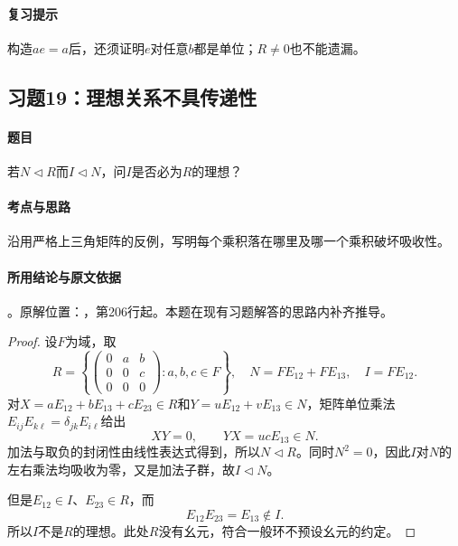 \paragraph{复习提示}

构造$ae=a$后，还须证明$e$对任意$b$都是单位；$R\ne0$也不能遗漏。



\subsection{习题19：理想关系不具传递性}

\label{ex:3:19}

\paragraph{题目}

若$N\lhd R$而$I\lhd N$，问$I$是否必为$R$的理想？

\paragraph{考点与思路}

沿用严格上三角矩阵的反例，写明每个乘积落在哪里及哪一个乘积破坏吸收性。

\paragraph{所用结论与原文依据}

。原解位置：，第206行起。本题在现有习题解答的思路内补齐推导。


\begin{proof}

设$F$为域，取
\[
R=\left\{\begin{pmatrix}0&a&b\\0&0&c\\0&0&0\end{pmatrix}:a,b,c\in F\right\},\quad
N=FE_{12}+FE_{13},\quad I=FE_{12}.
\]
对$X=aE_{12}+bE_{13}+cE_{23}\in R$和$Y=uE_{12}+vE_{13}\in N$，矩阵单位乘法$E_{ij}E_{k\ell}=\delta_{jk}E_{i\ell}$给出
\[
XY=0,\qquad YX=ucE_{13}\in N.
\]
加法与取负的封闭性由线性表达式得到，所以$N\lhd R$。同时$N^2=0$，因此$I$对$N$的左右乘法均吸收为零，又是加法子群，故$I\lhd N$。

但是$E_{12}\in I$、$E_{23}\in R$，而
\[
E_{12}E_{23}=E_{13}\notin I.
\]
所以$I$不是$R$的理想。此处$R$没有幺元，符合一般环不预设幺元的约定。

\end{proof}

